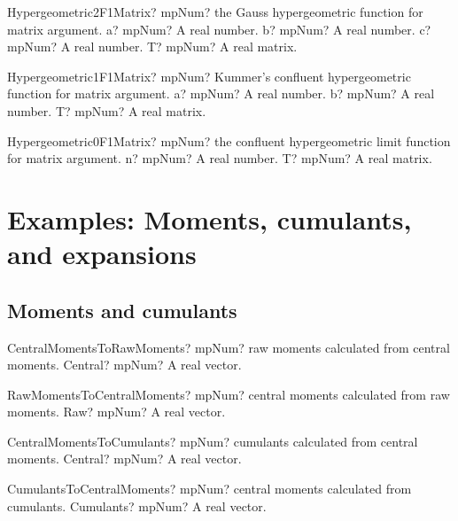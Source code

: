 \documentclass[12pt,a4paper,openany]{book}
\begin{document}
\begin{mpFunctionsExtract}
\mpFunctionFourNotImplemented
{Hypergeometric2F1Matrix? mpNum? the Gauss hypergeometric function for matrix argument.}
{a? mpNum? A real number.}
{b? mpNum? A real number.}
{c? mpNum? A real number.}
{T? mpNum? A real matrix.}
\end{mpFunctionsExtract}

\begin{mpFunctionsExtract}
\mpFunctionThreeNotImplemented
{Hypergeometric1F1Matrix? mpNum? Kummer's confluent hypergeometric function  for matrix argument.}
{a? mpNum? A real number.}
{b? mpNum? A real number.}
{T? mpNum? A real matrix.}
\end{mpFunctionsExtract}

\begin{mpFunctionsExtract}
\mpFunctionTwoNotImplemented
{Hypergeometric0F1Matrix? mpNum? the confluent hypergeometric limit function for matrix argument.}
{n? mpNum? A real number.}
{T? mpNum? A real matrix.}
\end{mpFunctionsExtract}

\chapter{Examples: Moments, cumulants, and expansions}

\section{Moments and cumulants}

\begin{mpFunctionsExtract}
\mpFunctionOneNotImplemented
{CentralMomentsToRawMoments? mpNum? raw moments calculated from central moments.}
{Central? mpNum? A real vector.}
\end{mpFunctionsExtract}

\begin{mpFunctionsExtract}
\mpFunctionOneNotImplemented
{RawMomentsToCentralMoments? mpNum? central moments calculated from raw moments.}
{Raw? mpNum? A real vector.}
\end{mpFunctionsExtract}

\begin{mpFunctionsExtract}
\mpFunctionOneNotImplemented
{CentralMomentsToCumulants? mpNum? cumulants calculated from central moments.}
{Central? mpNum? A real vector.}
\end{mpFunctionsExtract}

\begin{mpFunctionsExtract}
\mpFunctionOneNotImplemented
{CumulantsToCentralMoments? mpNum? central moments calculated from cumulants.}
{Cumulants? mpNum? A real vector.}
\end{mpFunctionsExtract}
\end{document}

